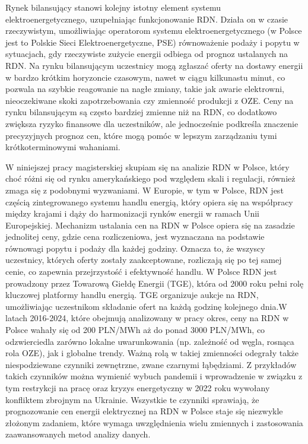 Rynek bilansujący stanowi kolejny istotny element systemu elektroenergetycznego, uzupełniając funkcjonowanie RDN. Działa on w czasie rzeczywistym, umożliwiając operatorom systemu elektroenergetycznego (w Polsce jest to Polskie Sieci Elektroenergetyczne, PSE) równoważenie podaży i popytu w sytuacjach, gdy rzeczywiste zużycie energii odbiega od prognoz ustalanych na RDN. Na rynku bilansującym uczestnicy mogą zgłaszać oferty na dostawy energii w bardzo krótkim horyzoncie czasowym, nawet w ciągu kilkunastu minut, co pozwala na szybkie reagowanie na nagłe zmiany, takie jak awarie elektrowni, nieoczekiwane skoki zapotrzebowania czy zmienność produkcji z OZE. Ceny na rynku bilansującym są często bardziej zmienne niż na RDN, co dodatkowo zwiększa ryzyko finansowe dla uczestników, ale jednocześnie podkreśla znaczenie precyzyjnych prognoz cen, które mogą pomóc w lepszym zarządzaniu tymi krótkoterminowymi wahaniami.

W niniejszej pracy magisterskiej skupiam się na analizie RDN w Polsce, który choć różni się od rynku amerykańskiego pod względem skali i regulacji, również zmaga się z podobnymi wyzwaniami. W Europie, w tym w Polsce, RDN jest częścią zintegrowanego systemu handlu energią, który opiera się na współpracy między krajami i dąży do harmonizacji rynków energii w ramach Unii Europejskiej. Mechanizm ustalania cen na RDN w Polsce opiera się na zasadzie jednolitej ceny, gdzie cena rozliczeniowa, jest wyznaczana na podstawie równowagi popytu i podaży dla każdej godziny. Oznacza to, że wszyscy uczestnicy, których oferty zostały zaakceptowane, rozliczają się po tej samej cenie, co zapewnia przejrzystość i efektywność handlu. W Polsce RDN jest prowadzony przez Towarową Giełdę Energii (TGE), która od 2000 roku pełni rolę kluczowej platformy handlu energią. TGE organizuje aukcje na RDN, umożliwiając uczestnikom składanie ofert na każdą godzinę kolejnego dnia.W latach 2016-2024, które obejmują analizowany w pracy okres, ceny na RDN w Polsce wahały się od 200 PLN/MWh aż do ponad 3000 PLN/MWh, co odzwierciedla zarówno lokalne uwarunkowania (np. zależność od węgla, rosnąca rola OZE), jak i globalne trendy. Ważną rolą w takiej zmienności odegrały także niespodziewane czynniki zewnętrzne, zwane czarnymi łąbędziami. Z przykładów takich czynników można wymienić wybuch pandemii i wprowadzenie w związku z tym restrykcji na pracę oraz kryzys energetyczny w 2022 roku wywołany konfliktem zbrojnym na Ukrainie. Wszystkie te czynniki sprawiają, że prognozowanie cen energii elektrycznej na RDN w Polsce staje się niezwykle złożonym zadaniem, które wymaga uwzględnienia wielu zmiennych i zastosowania zaawansowanych metod analizy danych.